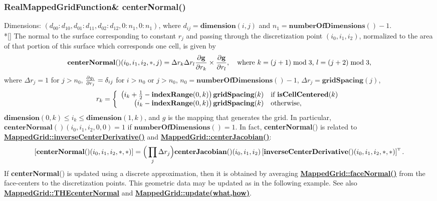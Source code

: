 \documentclass{article}
\begin{document}
  \subsubsection{RealMappedGridFunction\& centerNormal()}
  \label{MappedGrid::centerNormal()}
    Dimensions: $(d_{00}\colon d_{10},d_{01}\colon d_{11},d_{02}\colon d_{12},0\colon n_1,0\colon n_1)$,
    where $d_{ij} = \textbf{dimension}(i,j)$ and $n_1 = \textbf{numberOfDimensions}() - 1$. \\*[\parskip]
    The normal to the surface corresponding to constant $r_j$ and passing through the
    discretization point $(i_0,i_1,i_2)$,
    normalized to the area of that portion of this surface which corresponds one cell, is given by
    \[
      \textbf{centerNormal}()(i_0,i_1,i_2,\ast,j) = \Delta r_k \Delta r_l
      {\partial \textbf{g} \over \partial r_k} \times {\partial \textbf{g} \over \partial r_l},
      \quad\mbox{where $k=(j+1)\bmod3$, $l=(j+2)\bmod3$},
    \]
    where $\Delta r_j=1$ for $j>n_0$, ${\partial g_i \over \partial r_j} = \delta_{ij}$
    for $i>n_0$ or $j>n_0$, $n_0=\textbf{numberOfDimensions}()-1$, $\Delta r_j = \textbf{gridSpacing}(j)$,
    \[
      r_k = \left\{ \begin{array}{rl}
        \big(i_k + {1\over2} - \textbf{indexRange}(0,k)\big)\,\textbf{gridSpacing}(k) & \mbox{if \bf{}isCellCentered}(k) \\
        \big(i_k             - \textbf{indexRange}(0,k)\big)\,\textbf{gridSpacing}(k) & \mbox{otherwise},                \\
      \end{array} \right.
    \]
    $\textbf{dimension}(0,k) \le i_k \le \textbf{dimension}(1,k)$, and {\boldmath $g$} is the mapping that generates the grid.
    In particular, $\textbf{centerNormal}()(i_0,i_1,i_2,0,0)=1$ if $\textbf{numberOfDimensions}()=1$.
    In fact, \textbf{centerNormal}() is related to
    {\bf{}\hyperref{inverseCenterDerivative()}{inverseCenterDerivative() \rm(\S}{)}{MappedGrid::inverseCenterDerivative()}}
    and {\bf{}\hyperref{centerJacobian()}{centerJacobian() \rm(\S}{)}{MappedGrid::centerJacobian()}}:
    \[
      \left[ \textbf{centerNormal}()(i_0,i_1,i_2,\ast,\ast) \right] =
      \Big(\prod_j \Delta r_j\Big) \textbf{centerJacobian}()(i_0,i_1,i_2)
      \left[ \textbf{inverseCenterDerivative}()(i_0,i_1,i_2,\ast,\ast) \right]^{\mbox{\tiny T}}.
    \]
    If \textbf{centerNormal}() is updated using a discrete approximation, then it is obtained by averaging
    {\bf{}\hyperref{faceNormal()}{faceNormal() \rm(\S}{)}{MappedGrid::faceNormal()}}
    from the face-centers to the discretization points.
    This geometric data may be updated as in the following example.
    See also {\bf{}\hyperref{THEcenterNormal}{THEcenterNormal \rm(\S}{)}{MappedGrid::THEcenterNormal}}
    and {\bf{}\hyperref{update(what,how)}{update(what,how) \rm(\S}{)}{MappedGrid::update(what,how)}}.
\end{document}
